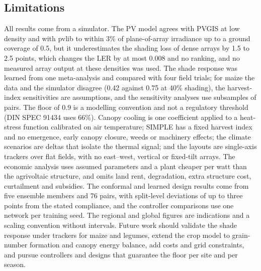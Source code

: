\subsection{Limitations}\label{sec:limits}
All results come from a simulator. The PV model agrees with PVGIS at low density and with pvlib to within 3\% of plane-of-array irradiance up to a ground coverage of 0.5, but it underestimates the shading loss of dense arrays by 1.5 to 2.5 points, which changes the LER by at most 0.008 and no ranking, and no measured array output at these densities was used. The shade response was learned from one meta-analysis and compared with four field trials; for maize the data and the simulator disagree (0.42 against 0.75 at 40\% shading), the harvest-index sensitivities are assumptions, and the sensitivity analyses use subsamples of pairs. The floor of 0.9 is a modelling convention and not a regulatory threshold (DIN SPEC 91434 uses 66\%). Canopy cooling is one coefficient applied to a heat-stress function calibrated on air temperature; SIMPLE has a fixed harvest index and no emergence, early canopy closure, weeds or machinery effects; the climate scenarios are deltas that isolate the thermal signal; and the layouts are single-axis trackers over flat fields, with no east--west, vertical or fixed-tilt arrays. The economic analysis uses assumed parameters and a plant cheaper per watt than the agrivoltaic structure, and omits land rent, degradation, extra structure cost, curtailment and subsidies. The conformal and learned design results come from five ensemble members and 76 pairs, with split-level deviations of up to three points from the stated compliance, and the controller comparisons use one network per training seed. The regional and global figures are indications and a scaling convention without intervals. Future work should validate the shade response under trackers for maize and legumes, extend the crop model to grain-number formation and canopy energy balance, add costs and grid constraints, and pursue controllers and designs that guarantee the floor per site and per season.
